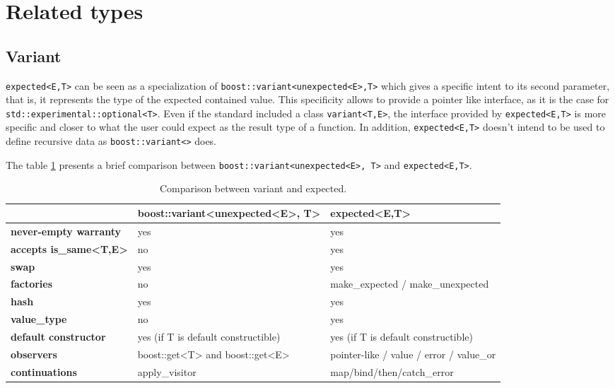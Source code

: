 \documentclass[a4paper,10pt]{article}
\newcommand{\cpp}[1]{\lstinline{#1}}
\begin{document}
\section{Related types}

\subsection{Variant}

\cpp{expected<E,T>} can be seen as a specialization of  \cpp{boost::variant<unexpected<E>,T>} which gives a specific intent to its second parameter, that is, it represents the type of the expected contained value. This specificity allows to provide a pointer like interface, as it is the case for \cpp{std::experimental::optional<T>}. Even if the standard included a class  \cpp{variant<T,E>}, the interface provided by \cpp{expected<E,T>} is more specific and closer to what the user could expect as the result type of a function. In addition, \cpp{expected<E,T>} doesn't intend to be used to define recursive data as \cpp{boost::variant<>} does.

The table \ref{comp-variant} presents a brief comparison between \cpp{boost::variant<unexpected<E>, T>} and \cpp{expected<E,T>}.

\begin{table}[h!]
\bgroup
\def\arraystretch{1.5}
\begin{tabular}
{|l|>{\raggedright\arraybackslash}p{6cm}|>{\raggedright\arraybackslash}p{6cm}|}
\hline
                    & \textbf{boost::variant<unexpected<E>, T>} & \textbf{expected<E,T>}  \\
\hline
\textbf{never-empty warranty} & yes & yes \\
\hline
\textbf{accepts is_same<T,E>} & no & yes \\
\hline
\textbf{swap} & yes & yes \\
\hline
\textbf{factories} & no & make\_expected / make\_unexpected  \\
\hline
\textbf{hash} & yes & yes  \\
\hline
\textbf{value_type} & no & yes  \\
\hline
\textbf{default constructor} & yes (if T is default constructible) & yes (if T is default constructible)  \\
\hline
\textbf{observers} & boost::get<T> and boost::get<E> & pointer-like / value / error / value_or \\
\hline
\textbf{continuations} & apply_visitor & map/bind/then/catch_error  \\
\hline
\end{tabular}
\egroup
\caption{Comparison between variant and expected.}
\label{comp-variant}
\end{table}
\end{document}
